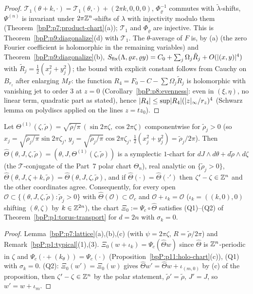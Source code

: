 \begin{proof}
\label{stepP:p11:hc-lat} $\mathcal T_1(\theta+k,\cdot)=\mathcal T_1(\theta,\cdot)+(2\pi k,0,0,0)$, $\Phi_\varrho^{-1}$ commutes with $\tilde\lambda$-shifts, $\Psi^{(n)}$ is invariant under $2\pi\mathbb{Z}^n$-shifts of $\lambda$ with injectivity modulo them (Theorem~\ref{bpP:p7:product-chart}(a)); $\mathcal T_1$ and $\Phi_\varrho$ are injective. This is Theorem~\ref{bpP:p9:diagonalize}(d) with $\mathcal T_1$.
\label{stepP:p11:hc-mean} The $\theta$-average of $F$ is, by (a) (the zero Fourier coefficient is holomorphic in the remaining variables) and Theorem~\ref{bpP:p9:diagonalize}(b), $S_{\rm fix}(\Lambda,\varrho x,\varrho y)=C_0+\sum_j\Omega_j\tilde R_j+O(\lvert (x,y)\rvert^4)$ with $\tilde R_j=\frac12(x_j^2+y_j^2)$; the bound with explicit constant follows from Cauchy on $B_{r_z}$ after enlarging $M_F$: the function $R_4=F_0-C-\sum\Omega_j\tilde R_j$ is holomorphic with vanishing jet to order $3$ at $z=0$ (Corollary~\ref{bpP:p8:evenness}: even in $(\xi,\eta)$, no linear term, quadratic part as stated), hence $\lvert R_4\rvert\le\sup\lvert R_4\rvert(\lvert z\rvert_\infty/r_z)^4$ (Schwarz lemma on polydiscs applied on the lines $z=tz_0$).
\end{proof}

\begin{lemma}\label{bpP:p11:total-chart}
Let $\Theta^{(1)}(\zeta,\tilde\rho)=\sqrt{\tilde\rho/\pi}\,(\sin2\pi\zeta,\cos2\pi\zeta)$ componentwise for $\tilde\rho_j>0$ (so $x_j=\sqrt{\tilde\rho_j/\pi}\sin2\pi\zeta_j$, $y_j=\sqrt{\tilde\rho_j/\pi}\cos2\pi\zeta_j$, $\frac12(x_j^2+y_j^2)=\tilde\rho_j/2\pi$). Then $\hat\Theta(\theta,J,\zeta,\tilde\rho)=(\theta,J,\Theta^{(1)}(\zeta,\tilde\rho))$ is a symplectic $1$-chart for $dJ\wedge d\theta+d\tilde\rho\wedge d\zeta$ (the $\mathcal T$-conjugate of the Part~7 polar chart $\Theta_n$), real analytic on $\{\tilde\rho_j>0\}$, $\hat\Theta(\theta,J,\zeta+k,\tilde\rho)=\hat\Theta(\theta,J,\zeta,\tilde\rho)$, and if $\hat\Theta(\cdot)=\hat\Theta(\cdot')$ then $\zeta'-\zeta\in\mathbb{Z}^n$ and the other coordinates agree. Consequently, for every open $\mathcal O\subset\{(\theta,J,\zeta,\tilde\rho):\tilde\rho_j>0\}$ with $\hat\Theta(\mathcal O)\subset\mathcal O_c$ and $\mathcal O+\iota_k=\mathcal O$ ($\iota_k=((k,0),0)$ shifting $(\theta,\zeta)$ by $k\in\mathbb{Z}^{2n}$), the chart $\Xi_0:=\Psi_c\circ\hat\Theta$ satisfies (Q1)--(Q2) of Theorem~\ref{bpP:p1:torus-transport} for $d=2n$ with $\sigma_k=0$.
\end{lemma}
\begin{proof}
\label{stepP:p11:tc-polar} Lemma~\ref{bpP:p7:lattice}(a),(b),(c) (with $\psi=2\pi\zeta$, $R=\tilde\rho/2\pi$) and Remark~\ref{bpP:p1:typical}(1),(3).
\label{stepP:p11:tc-lat} $\Xi_0(w+\iota_k)=\Psi_c(\hat\Theta w)$ since $\hat\Theta$ is $\mathbb{Z}^n$-periodic in $\zeta$ and $\Psi_c(\cdot+(k_\theta))=\Psi_c(\cdot)$ (Proposition~\ref{bpP:p11:holo-chart}(c)), (Q1) with $\sigma_k=0$. (Q2): $\Xi_0(w')=\Xi_0(w)$ gives $\hat\Theta w'=\hat\Theta w+\iota_{(m,0)}$ by (c) of the proposition, then $\zeta'-\zeta\in\mathbb{Z}^n$ by the polar statement, $\tilde\rho'=\tilde\rho$, $J'=J$, so $w'=w+\iota_m$.
\end{proof}

